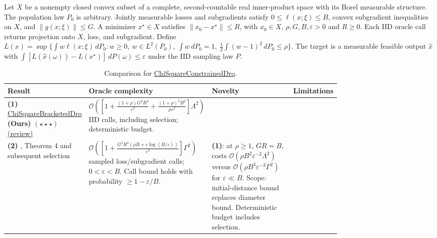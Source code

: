 \begin{table}[tp]
\centering
\caption{Comparison for \href{https://github.com/k3nfalt/longtails/blob/main/LongTails/Setups/ChiSquareConstrainedDro.lean}{ChiSquareConstrainedDro}.}\label{tab:ChiSquareConstrainedDro}
\parbox{\linewidth}{\footnotesize Let $X$ be a nonempty closed convex subset of a complete, second-countable real inner-product space with its Borel measurable structure. The population law $P_0$ is arbitrary. Jointly measurable losses and subgradients satisfy $0\le\ell(x;\xi)\le B$, convex subgradient inequalities on $X$, and $\|g(x;\xi)\|\le G$. A minimizer $x^\star\in X$ satisfies $\|x_0-x^\star\|\le R$, with $x_0\in X$, $\rho,G,B,\varepsilon>0$ and $R\ge0$. Each IID oracle call returns projection onto $X$, loss, and subgradient. Define $L(x)=\sup\{\int w\ell(x;\xi)\,dP_0: w\ge0,\ w\in L^2(P_0),\ \int w\,dP_0=1,\ \frac12\int(w-1)^2\,dP_0\le\rho\}$. The target is a measurable feasible output $\hat x$ with $\int[L(\hat x(\omega))-L(x^\star)]\,dP(\omega)\le\varepsilon$ under the IID sampling law $P$.}\par\smallskip
\begin{threeparttable}
\footnotesize
\setlength{\tabcolsep}{4pt}\renewcommand{\arraystretch}{1.25}
\begin{tabularx}{\linewidth}{@{}>{\raggedright\arraybackslash}p{0.20\linewidth}>{\raggedright\arraybackslash}p{0.32\linewidth}>{\raggedright\arraybackslash}p{0.25\linewidth}>{\raggedright\arraybackslash}X@{}}
\toprule
\textbf{Result} & \textbf{Oracle complexity} & \textbf{Novelty} & \textbf{Limitations} \\
\midrule
\textbf{(1)} \href{https://github.com/k3nfalt/longtails/blob/main/LongTails/Theorems/ChiSquareBracketedDro.lean}{Chi\allowbreak Square\allowbreak Bracketed\allowbreak Dro} \textbf{(Ours)} $(\star\star\star)$ \href{https://github.com/k3nfalt/longtails/blob/main/scripts/reviews/ChiSquareBracketedDro.md}{(review)}
& $\mathcal{O}\!\left(\left[1+\frac{(1+\rho)G^2R^2}{\varepsilon^2}+\frac{(1+\rho)^2B^2}{\rho\varepsilon^2}\right]\Lambda^2\right)$ IID calls, including selection; deterministic budget.
& & \\
\midrule[1.2pt]
\textbf{(2)} \citep{chiLevy2020v2}, Theorem 4 and subsequent selection
& $\mathcal{O}\!\left(\left[1+\frac{G^2R^2(\rho B+\varepsilon\log(B/\varepsilon))}{\varepsilon^3}\right]\Gamma^2\right)$ sampled loss/subgradient calls; $0<\varepsilon<B$. Call bound holds with probability $\ge1-\varepsilon/B$.
& \textbf{(1)}: at $\rho\ge1$, $GR=B$, costs $\mathcal{O}(\rho B^2\varepsilon^{-2}\Lambda^2)$ versus $\mathcal{O}(\rho B^3\varepsilon^{-3}\Gamma^2)$ for $\varepsilon\ll B$. Scope: initial-distance bound replaces diameter bound. Deterministic budget includes selection.

\end{tabularx}
\end{threeparttable}
\end{table}
